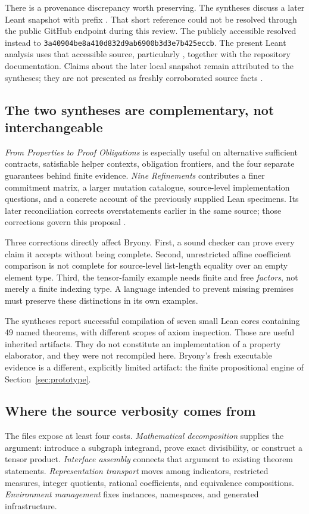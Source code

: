 \documentclass[11pt,a4paper]{article}
\newcommand{\code}[1]{\texttt{\detokenize{#1}}}
\theoremstyle{definition}\newtheorem{definition}[theorem]{Definition}
\theoremstyle{remark}\newtheorem{remark}[theorem]{Remark}
\begin{document}
There is a provenance discrepancy worth preserving. The syntheses discuss a later Leant snapshot with prefix \code{823259f7}. That short reference could not be resolved through the public GitHub endpoint during this review. The publicly accessible \code{main} resolved instead to
\nolinkurl{3a40904be8a410d832d9ab6900b3d3e7b425eccb}. The present Leant analysis uses that accessible source, particularly \code{Verification.hs}, together with the repository documentation. Claims about the later local snapshot remain attributed to the syntheses; they are not presented as freshly corroborated source facts \cite{leant,verification,synA,synB}.

\subsection{The two syntheses are complementary, not interchangeable}
\emph{From Properties to Proof Obligations} is especially useful on alternative sufficient contracts, satisfiable helper contexts, obligation frontiers, and the four separate guarantees behind finite evidence. \emph{Nine Refinements} contributes a finer commitment matrix, a larger mutation catalogue, source-level implementation questions, and a concrete account of the previously supplied Lean specimens. Its later reconciliation corrects overstatements earlier in the same source; those corrections govern this proposal \cite{synA,synB}.

Three corrections directly affect Bryony. First, a sound checker can prove every claim it accepts without being complete. Second, unrestricted affine coefficient comparison is not complete for source-level list-length equality over an empty element type. Third, the tensor-family example needs finite and free \emph{factors}, not merely a finite indexing type. A language intended to prevent missing premises must preserve these distinctions in its own examples.

The syntheses report successful compilation of seven small Lean cores containing 49 named theorems, with different scopes of axiom inspection. Those are useful inherited artifacts. They do not constitute an implementation of a property elaborator, and they were not recompiled here. Bryony's fresh executable evidence is a different, explicitly limited artifact: the finite propositional engine of Section~\ref{sec:prototype}.

\subsection{Where the source verbosity comes from}
The files expose at least four costs. \emph{Mathematical decomposition} supplies the argument: introduce a subgraph integrand, prove exact divisibility, or construct a tensor product. \emph{Interface assembly} connects that argument to existing theorem statements. \emph{Representation transport} moves among indicators, restricted measures, integer quotients, rational coefficients, and equivalence compositions. \emph{Environment management} fixes instances, namespaces, and generated infrastructure.
\end{document}
